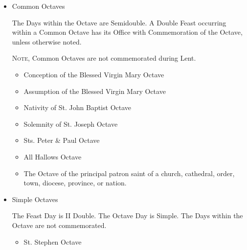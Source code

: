 \begin{itemize}
\begin{itemize}
            \item Common Octaves\par
            The Days within the Octave are Semidouble. A Double Feast occurring within a Common Octave has its Office with Commemoration of the Octave, unless otherwise noted.\par
            \textsc{Note,} Common Octaves are not commemorated during Lent.
                \begin{itemize}
                    \item Conception of the Blessed Virgin Mary Octave
                    \item Assumption of the Blessed Virgin Mary Octave
                    \item Nativity of St. John Baptist Octave
                    \item Solemnity of St. Joseph Octave
                    \item Sts. Peter \& Paul Octave
                    \item All Hallows Octave
                    \item The Octave of the principal patron saint of a church, cathedral, order, town, diocese, province, or nation. 
                \end{itemize}
            \item Simple Octaves\par
            The Feast Day is II Double. The Octave Day is Simple. The Days within the Octave are not commemorated.
                \begin{itemize}
                    \item St. Stephen Octave

\end{itemize}
\end{itemize}
\end{itemize}
